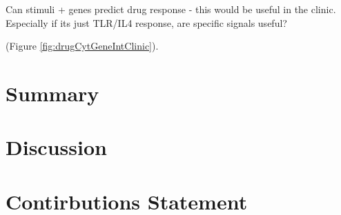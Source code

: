 \documentclass[11pt, a4paper, twosided]{book}
\begin{document}
Can stimuli + genes predict drug response - this would be useful in the clinic. Especially if its just TLR/IL4 response, are specific signals useful?

(Figure \ref{fig:drugCytGeneIntClinic}).



\hypertarget{summary-2}{%
\section{Summary}\label{summary-2}}

\hypertarget{discussion-2}{%
\section{Discussion}\label{discussion-2}}

\hypertarget{contirbutions-statement}{%
\section{Contirbutions Statement}\label{contirbutions-statement}}
\end{document}
